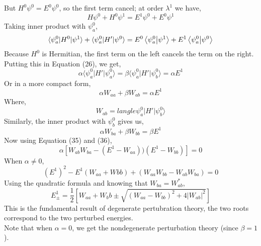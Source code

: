 But $H^0\psi^0=E^0\psi^0$, so the first term cancel; at order $\lambda^1$ we have,
\begin{equation}
H\psi^0+H^0\psi^1=E^1\psi^0+E^0\psi^1
\end{equation}
Taking inner product with $\psi^0_a$,
\begin{equation}
\langle\psi^0_a\vert H^0 \vert \psi^1\rangle+ \langle\psi^0_a\vert H' \vert \psi^0\rangle=E^0\braket{\psi^0_a}{\psi^1} + E^1\braket{\psi^0_a}{\psi^0}
\end{equation}
Because $H^0$ is Hermitian, the first term on the left cancels the term on the right. Putting this in Equation (26), we get,
\begin{equation}
\alpha \langle\psi^0_a\vert H' \vert \psi^0_a\rangle=\beta \langle\psi^0_a\vert H' \vert \psi^0_b\rangle=\alpha E^1
\end{equation}
Or in a more compact form,
\begin{equation}
\alpha W_{aa}+\beta W_{ab}=\alpha E^1
\end{equation}
Where,
\begin{equation*}
W_{ab}= langle\psi^0_a\vert H' \vert \psi^0_b\rangle
\end{equation*}
Similarly, the inner product with $\psi^0_b$ gives us,
\begin{equation}
\alpha W_{ba}+\beta W_{bb}=\beta E^1
\end{equation}
Now using Equation (35) and (36),
\begin{equation}
\alpha[W_{ab}W_{ba}-(E^1-W_{aa}))(E^1-W_{bb})]=0
\end{equation}
When $\alpha\neq 0$,
\begin{equation}
(E^1)^2-E^1(W_{aa}+W{bb})+(W_{aa}W_{bb}-W_{ab}W_{ba})=0
\end{equation}
Using the quadratic formula and knowing that $W_{ba}=W^*_{ab}$,
\begin{equation}
E^1_\pm=\frac{1}{2}\left[W_{aa}+W_bb\pm\sqrt{(W_{aa}-W_{bb})^2+4\vert W_{ab}\vert^2}\right]
\end{equation}
This is the fundamental result of degenerate pertubration theory, the two roots correspond to the two perturbed energies.\\
Note that when $\alpha=0$, we get the nondegenerate perturbation theory (since $\beta=1$).


